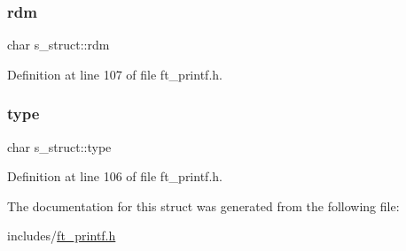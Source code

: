 \subsubsection{\texorpdfstring{rdm}{rdm}}
{\footnotesize\ttfamily char s\+\_\+struct\+::rdm}



Definition at line 107 of file ft\+\_\+printf.\+h.

\mbox{\label{structs__struct_ab8c0632b6294515ba029b3cb3efa71da}} 
\subsubsection{\texorpdfstring{type}{type}}
{\footnotesize\ttfamily char s\+\_\+struct\+::type}



Definition at line 106 of file ft\+\_\+printf.\+h.



The documentation for this struct was generated from the following file\+:\begin{DoxyCompactItemize}
\item 
includes/\hyperlink{ft__printf_8h}{ft\+\_\+printf.\+h}\end{DoxyCompactItemize}
